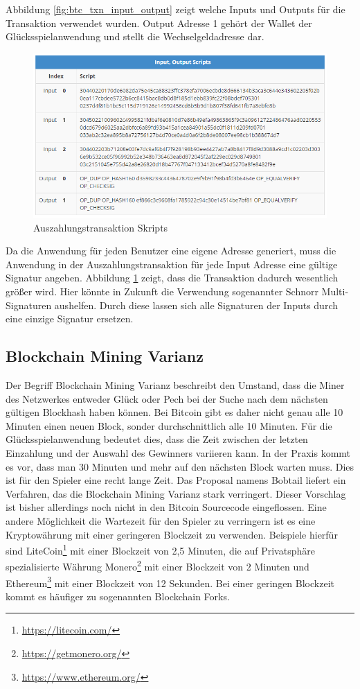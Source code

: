 Abbildung \ref{fig:btc_txn_input_output} zeigt welche Inputs und Outputs für die Transaktion verwendet wurden. Output Adresse 1 gehört der Wallet der Glücksspielanwendung und stellt die Wechselgeldadresse dar.


\begin{figure}[H]
\centering
\includegraphics[width=1\linewidth]{Figures/btc_gui/btc_txn_input_output_scripts}
\decoRule
\caption{Auszahlungstransaktion Skripts}
\label{fig:btc_txn_input_output_scripts}
\end{figure}

Da die Anwendung für jeden Benutzer eine eigene Adresse generiert, muss die Anwendung in der Auszahlungstransaktion für jede Input Adresse eine gültige Signatur angeben. Abbildung \ref{fig:btc_txn_input_output_scripts} zeigt, dass die Transaktion dadurch wesentlich größer wird. Hier könnte in Zukunft die Verwendung sogenannter Schnorr Multi-Signaturen aushelfen. Durch diese lassen sich alle Signaturen der Inputs durch eine einzige Signatur ersetzen. \citep{schnorr_sig}


\subsection{Blockchain Mining Varianz}
Der Begriff Blockchain Mining Varianz beschreibt den Umstand, dass die Miner des Netzwerkes entweder Glück oder Pech bei der Suche nach dem nächsten gültigen Blockhash haben können. Bei Bitcoin gibt es daher nicht genau alle 10 Minuten einen neuen Block, sonder durchschnittlich alle 10 Minuten. Für die Glücksspielanwendung bedeutet dies, dass die Zeit zwischen der letzten Einzahlung und der Auswahl des Gewinners variieren kann. In der Praxis kommt es vor, dass man 30 Minuten und mehr auf den nächsten Block warten muss. Dies ist für den Spieler eine recht lange Zeit. Das Proposal namens Bobtail\cite{bobtail} liefert ein Verfahren, das die Blockchain Mining Varianz stark verringert. Dieser Vorschlag ist bisher allerdings noch nicht in den Bitcoin Sourcecode eingeflossen.
Eine andere Möglichkeit die Wartezeit für den Spieler zu verringern ist es eine  Kryptowährung mit einer geringeren Blockzeit zu verwenden. Beispiele hierfür sind LiteCoin\footnote{\url{https://litecoin.com/}} mit einer Blockzeit von 2,5 Minuten, die auf Privatsphäre spezialisierte Währung Monero\footnote{\url{https://getmonero.org/}} mit einer Blockzeit von 2 Minuten und Ethereum\footnote{\url{https://www.ethereum.org/}} mit einer Blockzeit von 12 Sekunden. Bei einer geringen Blockzeit kommt es häufiger zu sogenannten Blockchain Forks.

